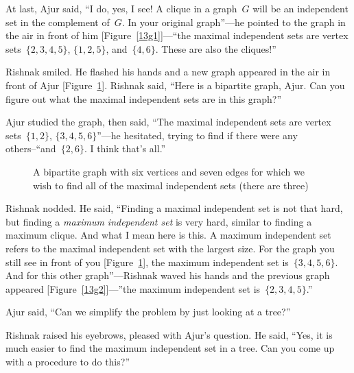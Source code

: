 At last, Ajur said, ``I do, yes, I see! A clique in a graph~$G$ will be an independent set in the 
complement of~$G$. In your original graph''---he pointed to the graph in the air in front of him [Figure~\ref{13g1}]---``the maximal independent sets are vertex sets~$\{2,3,4,5\}$, $\{1,2,5\}$, and~$\{4,6\}$. These are also the cliques!''

Rishnak smiled. He flashed his hands and a new graph appeared in the air in front of Ajur [Figure~\ref{13g3}]. Rishnak said, ``Here is a bipartite graph, Ajur. Can you figure out what the maximal independent sets are in this graph?''

Ajur studied the graph, then said, ``The maximal independent sets are vertex sets~$\{1,2\}$, $\{3,4,5,6\}$''---he hesitated, trying to find if there were any others--``and~$\{2,6\}$. I think that's all.''

\begin{figure}
\begin{center}
\caption{A bipartite graph with six vertices and seven edges for which we wish to find all of the maximal independent sets (there are three)}\label{13g3}
\end{center}
\end{figure}

Rishnak nodded. He said, ``Finding a maximal independent set is not that hard, but finding a \textit{maximum independent set} is very hard, similar to finding a maximum clique. And what I mean here is this. A maximum independent set refers to the maximal independent set with the largest size. For the graph you still see in front of you [Figure~\ref{13g3}], the maximum independent set is~$\{3,4,5,6\}$. And for this other graph''---Rishnak waved his hands and the previous graph appeared [Figure~\ref{13g2}]---''the maximum independent set is~$\{2,3,4,5\}$.''

Ajur said, ``Can we simplify the problem by just looking at a tree?''

Rishnak raised his eyebrows, pleased with Ajur's question.  He said, ``Yes, it is much easier to find the maximum independent set in a tree.  Can you come up with a procedure to do this?''

